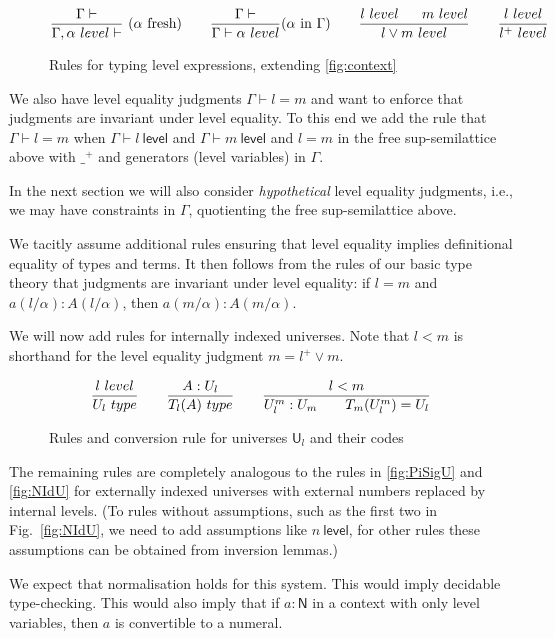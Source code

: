 \documentclass[a4paper,UKenglish,cleveref, autoref, thm-restate]{lipics-v2021}
\newcommand{\NN}{\mathsf{N}}
\newcommand{\UU}{\mathsf{U}}
\newcommand{\Level}{\mathsf{level}}
\newcommand{\type}{\mathsf{type}}
\newcommand{\T}{\mathsf{T}}
\begin{document}
\begin{figure}[H]
  \caption{Rules for typing level expressions, extending
  \cref{fig:context}}\label{fig:contextL}
$$
\frac{\Gamma\vdash}{\Gamma,\alpha~\Level\vdash}~(\alpha~\text{fresh})~~~~~~
\frac{\Gamma\vdash}{\Gamma\vdash\alpha~\Level}(\alpha~\text{in}~\Gamma)~~~~~~
\frac{l~\Level~~~~~m~\Level}{l\vee m~\Level}~~~~~~
\frac{l~\Level}{l^+~\Level}
\belowdisplayshortskip 0pt
$$
\end{figure}

We also have level equality judgments $\Gamma\vdash l = m$
and want to enforce that judgments are invariant under level equality.
To this end we add the rule that $\Gamma\vdash l = m$
when $\Gamma\vdash l~\Level$ and $\Gamma\vdash m~\Level$ and
$l=m$ in the free sup-semilattice above with $\_^+$ and generators
(level variables) in $\Gamma$.

In the next section we will also consider \emph{hypothetical} level
equality judgments, i.e., we may have constraints in $\Gamma$,
quotienting the free sup-semilattice above.

We tacitly assume additional %
rules ensuring that level equality
implies definitional equality of types and terms.
It then follows from the rules of our basic type theory that
judgments are invariant under level equality: if $l=m$ and
${a(l/\alpha) : A(l/\alpha)}$, then ${a(m/\alpha) : A(m/\alpha)}$.

We will now add rules for internally indexed universes.
Note that $l<m$ is shorthand for the level equality judgment
$m= l^+ \vee m$.
\begin{figure}[H]
  \caption{Rules and conversion rule for universes $\UU_l$ and their codes}\label{fig:typeUl}
$$
\frac{l~\Level}{\UU_l~\type}~~~~~~
\frac{A:\UU_{l}}{\T_{l}(A)~\type}~~~~~~
\frac{l<m}{\UU^{m}_{l}:\UU_{m}~~~~~~\T_{m}({\UU^{m}_{l}}) = \UU_{l}}
\belowdisplayshortskip 0pt
$$
\end{figure}

The remaining rules are completely analogous to the rules in
\cref{fig:PiSigU} and \cref{fig:NIdU}
for externally indexed universes with external numbers replaced
by internal levels. (To rules without assumptions, such as the first two
in Fig.~\ref{fig:NIdU}, we need to add assumptions like $n~\Level$,
for other rules these assumptions can be obtained from inversion lemmas.)

 We expect that normalisation holds for this system.
 This would imply decidable type-checking.
 This would also imply that if $a : \NN$ in a context with only
 level variables, then $a$ is convertible to a numeral.
\end{document}
